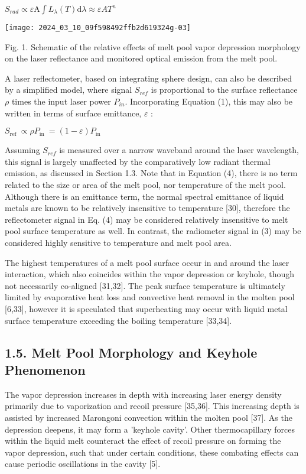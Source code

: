 \documentclass[10pt]{article}
\begin{document}
$S_{r a d} \propto \varepsilon \mathrm{A} \int L_{\lambda}(T) \mathrm{d} \lambda \approx \varepsilon A T^{n}$

\begin{center}
\texttt{[image: 2024\_03\_10\_09f598492ffb2d619324g-03]}
\end{center}

Fig. 1. Schematic of the relative effects of melt pool vapor depression morphology on the laser reflectance and monitored optical emission from the melt pool.

A laser reflectometer, based on integrating sphere design, can also be described by a simplified model, where signal $S_{r e f}$ is proportional to the surface reflectance $\rho$ times the input laser power $P_{i n}$. Incorporating Equation (1), this may also be written in terms of surface emittance, $\varepsilon$ :

$S_{\text {ref }} \propto \rho P_{\text {in }}=(1-\varepsilon) P_{\text {in }}$

Assuming $S_{r e f}$ is measured over a narrow waveband around the laser wavelength, this signal is largely unaffected by the comparatively low radiant thermal emission, as discussed in Section 1.3. Note that in Equation (4), there is no term related to the size or area of the melt pool, nor temperature of the melt pool. Although there is an emittance term, the normal spectral emittance of liquid metals are known to be relatively insensitive to temperature [30], therefore the reflectometer signal in Eq. (4) may be considered relatively insensitive to melt pool surface temperature as well. In contrast, the radiometer signal in (3) may be considered highly sensitive to temperature and melt pool area.

The highest temperatures of a melt pool surface occur in and around the laser interaction, which also coincides within the vapor depression or keyhole, though not necessarily co-aligned [31,32]. The peak surface temperature is ultimately limited by evaporative heat loss and convective heat removal in the molten pool [6,33], however it is speculated that superheating may occur with liquid metal surface temperature exceeding the boiling temperature [33,34].

\subsection*{1.5. Melt Pool Morphology and Keyhole Phenomenon}
The vapor depression increases in depth with increasing laser energy density primarily due to vaporization and recoil pressure [35,36]. This increasing depth is assisted by increased Marongoni convection within the molten pool [37]. As the depression deepens, it may form a 'keyhole cavity'. Other thermocapillary forces within the liquid melt counteract the effect of recoil pressure on forming the vapor depression, such that under certain conditions, these combating effects can cause periodic oscillations in the cavity [5].
\end{document}
